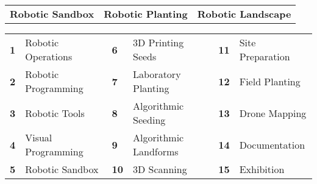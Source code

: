 \documentclass[11pt,article,oneside]{memoir}
\begin{document}
\vspace*{-1em}
\begin{table}[H]
\footnotesize
\begin{tabular}{l @{\hskip 1.6cm} l @{\hskip 2.1cm} l}
\textbf{Robotic Sandbox} & \textbf{Robotic Planting} & \textbf{Robotic Landscape}\\
\end{tabular}
\end{table}
%
\vspace*{-2em}
%
\begin{table}[H]
\footnotesize
\begin{tabular}{l l l l l l}
\small
\textbf{1} & Robotic Operations  & \textbf{6} & 3D Printing Seeds & \textbf{11} & Site Preparation\\
\textbf{2} & Robotic Programming & \textbf{7} & Laboratory Planting & \textbf{12} & Field Planting\\
\textbf{3} &  Robotic Tools & \textbf{8} & Algorithmic Seeding & \textbf{13} & Drone Mapping\\
\textbf{4} & Visual Programming & \textbf{9} & Algorithmic Landforms & \textbf{14} & Documentation\\
\textbf{5} & Robotic Sandbox & \textbf{10} & 3D Scanning & \textbf{15} & Exhibition\\
\end{tabular}
\end{table}
\end{document}
